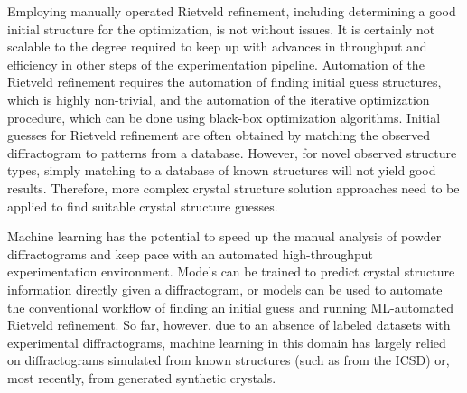 Employing manually operated Rietveld refinement, including determining a good initial structure for the optimization, is not without issues.
It is certainly not scalable to the degree required to keep up with advances in throughput and efficiency in other steps of the experimentation pipeline.
Automation of the Rietveld refinement requires the automation of finding initial guess structures, which is highly non-trivial, and the automation of the iterative optimization procedure, which can be done using black-box optimization algorithms. \cite{Ozaki2020}
Initial guesses for Rietveld refinement are often obtained by matching the observed diffractogram to patterns from a database.
However, for novel observed structure types, simply matching to a database of known structures will not yield good results. Therefore, more complex crystal structure solution approaches need to be applied to find suitable crystal structure guesses.

Machine learning has the potential to speed up the manual analysis of powder diffractograms and keep pace with an automated high-throughput experimentation environment. \cite{Agrawal2019} \cite{Surdu2023}
Models can be trained to predict crystal structure information directly given a diffractogram, or models can be used to automate the conventional workflow of finding an initial guess and running ML-automated Rietveld refinement. \cite{Surdu2023} 
So far, however, due to an absence of labeled datasets with experimental diffractograms, machine learning in this domain has largely relied on diffractograms simulated from known structures (such as from the ICSD) or, most recently, from generated synthetic crystals.

